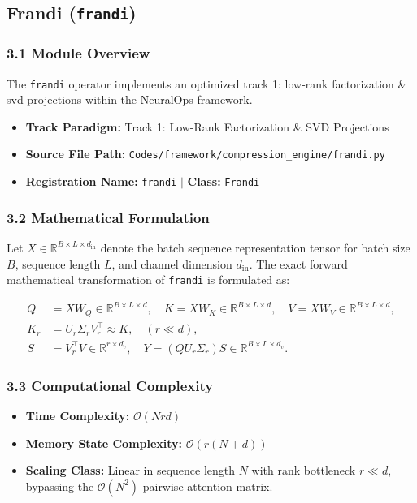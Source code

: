 \subsection{Frandi (\texttt{frandi})}
\label{sec:app_module_frandi}

\subsubsection*{3.1 Module Overview}
The \texttt{frandi} operator implements an optimized track 1: low-rank factorization \& svd projections within the NeuralOps framework.
\begin{itemize}
    \item \textbf{Track Paradigm:} Track 1: Low-Rank Factorization & SVD Projections
    \item \textbf{Source File Path:} \texttt{Codes/framework/compression\_engine/frandi.py}
    \item \textbf{Registration Name:} \texttt{frandi} $\mid$ \textbf{Class:} \texttt{Frandi}
\end{itemize}

\subsubsection*{3.2 Mathematical Formulation}
Let $X \in \mathbb{R}^{B \times L \times d_{\text{in}}}$ denote the batch sequence representation tensor for batch size $B$, sequence length $L$, and channel dimension $d_{\text{in}}$. The exact forward mathematical transformation of \texttt{frandi} is formulated as:

\begin{align}
Q &= X W_Q \in \mathbb{R}^{B \times L \times d}, \quad K = X W_K \in \mathbb{R}^{B \times L \times d}, \quad V = X W_V \in \mathbb{R}^{B \times L \times d}, \\
K_r &= U_r \Sigma_r V_r^\top \approx K, \quad (r \ll d), \\
S &= V_r^\top V \in \mathbb{R}^{r \times d_v}, \quad Y = (Q U_r \Sigma_r) S \in \mathbb{R}^{B \times L \times d_v}.
\end{align}


\subsubsection*{3.3 Computational Complexity}
\begin{itemize}
    \item \textbf{Time Complexity:} $\mathcal{O}(N r d)$
    \item \textbf{Memory State Complexity:} $\mathcal{O}(r(N + d))$
    \item \textbf{Scaling Class:} Linear in sequence length $N$ with rank bottleneck $r \ll d$, bypassing the $\mathcal{O}(N^2)$ pairwise attention matrix.
\end{itemize}

